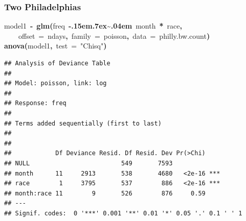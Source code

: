\documentclass[]{beamer}
\makeatletter
\newcommand{\hlfunctioncall}[1]{\textcolor[rgb]{.5,0,.33}{\textbf{#1}}}%
\newcommand{\hlstring}[1]{\textcolor[rgb]{.6,.6,1}{#1}}%
\newcommand{\hlkeyword}[1]{\textbf{#1}}%
\newcommand{\hlargument}[1]{\textcolor[rgb]{.69,.25,.02}{#1}}%
\newcommand{\hlassignement}[1]{\textbf{#1}}%
\newcommand{\hlsymbol}[1]{#1}%
\def\urltilda{\kern -.15em\lower .7ex\hbox{\~{}}\kern .04em}%
\newcommand{\hlstd}[1]{\textcolor[rgb]{0,0,0}{#1}}%
\newenvironment{kframe}{%
 \def\FrameCommand##1{\hskip\@totalleftmargin \hskip-\fboxsep
 \colorbox{shadecolor}{##1}\hskip-\fboxsep
     \hskip-\linewidth \hskip-\@totalleftmargin \hskip\columnwidth}%
 \MakeFramed {\advance\hsize-\width
   \@totalleftmargin\z@ \linewidth\hsize
   \@setminipage}}%
 {\par\unskip\endMakeFramed}
\newenvironment{knitrout}{}{} %
\renewenvironment{knitrout}{\begin{footnotesize}}{\end{footnotesize}}
\makeatother
\begin{document}
\begin{frame}[fragile]
\frametitle{Two Philadelphias}

\begin{knitrout}
\color{fgcolor}\begin{kframe}
\begin{flushleft}
\ttfamily\noindent
\hlsymbol{model1}{\ }\hlassignement{\usebox{\hlnormalsizeboxlessthan}-}{\ }\hlfunctioncall{glm}\hlkeyword{(}\hlsymbol{freq}{\ }\hlkeyword{\urltilda{}}{\ }\hlsymbol{month}{\ }\hlkeyword{*}{\ }\hlsymbol{race}\hlkeyword{,}\hspace*{\fill}\\
\hlstd{}{\ }{\ }{\ }{\ }\hlargument{offset}{\ }\hlargument{=}{\ }\hlsymbol{ndays}\hlkeyword{,}{\ }\hlargument{family}{\ }\hlargument{=}{\ }\hlsymbol{poisson}\hlkeyword{,}{\ }\hlargument{data}{\ }\hlargument{=}{\ }\hlsymbol{philly.bw.count}\hlkeyword{)}\hspace*{\fill}\\
\hlstd{}\hlfunctioncall{anova}\hlkeyword{(}\hlsymbol{model1}\hlkeyword{,}{\ }\hlargument{test}{\ }\hlargument{=}{\ }\hlstring{"{}Chisq"{}}\hlkeyword{)}\mbox{}
\normalfont
\end{flushleft}
\begin{verbatim}
## Analysis of Deviance Table
## 
## Model: poisson, link: log
## 
## Response: freq
## 
## Terms added sequentially (first to last)
## 
## 
##            Df Deviance Resid. Df Resid. Dev Pr(>Chi)    
## NULL                         549       7593             
## month      11     2913       538       4680   <2e-16 ***
## race        1     3795       537        886   <2e-16 ***
## month:race 11        9       526        876     0.59    
## ---
## Signif. codes:  0 '***' 0.001 '**' 0.01 '*' 0.05 '.' 0.1 ' ' 1 
\end{verbatim}
\end{kframe}
\end{knitrout}


\end{frame}
\end{document}
